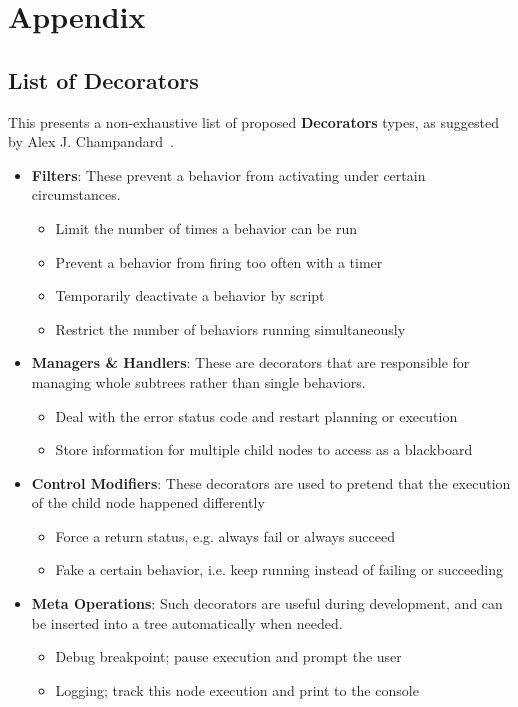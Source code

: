 \chapter*{Appendix}

    \section*{List of Decorators}
    \label{app:decorators}
        This presents a non-exhaustive list of proposed \textbf{Decorators} types, as suggested by Alex J. Champandard~\cite{btdecorators}.
        \begin{itemize}
        \item \textbf{Filters}: These prevent a behavior from activating under certain circumstances.
            \begin{itemize}
                \item Limit the number of times a behavior can be run
                \item Prevent a behavior from firing too often with a timer
                \item Temporarily deactivate a behavior by script
                \item Restrict the number of behaviors running simultaneously
            \end{itemize}
        \item \textbf{Managers \& Handlers}: These are decorators that are responsible for managing whole subtrees rather than single behaviors. 
            \begin{itemize}
                \item Deal with the error status code and restart planning or execution
                \item Store information for multiple child nodes to access as a blackboard            
            \end{itemize}
        \item \textbf{Control Modifiers}: These decorators are used to pretend that the execution of the child node happened differently
            \begin{itemize}
                \item Force a return status, e.g. always fail or always succeed
                \item Fake a certain behavior, i.e. keep running instead of failing or succeeding   
            \end{itemize}
        \item \textbf{Meta Operations}: Such decorators are useful during development, and can be inserted into a tree automatically when needed.
            \begin{itemize}
                \item Debug breakpoint; pause execution and prompt the user
                \item Logging; track this node execution and print to the console
            \end{itemize}        
        \end{itemize}
        
